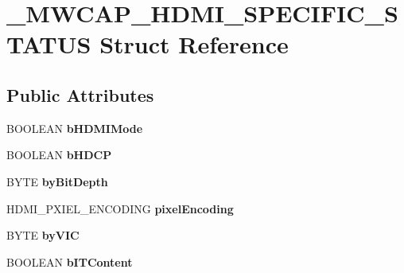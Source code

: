 \hypertarget{struct__MWCAP__HDMI__SPECIFIC__STATUS}{\section{\-\_\-\-M\-W\-C\-A\-P\-\_\-\-H\-D\-M\-I\-\_\-\-S\-P\-E\-C\-I\-F\-I\-C\-\_\-\-S\-T\-A\-T\-U\-S Struct Reference}
\label{struct__MWCAP__HDMI__SPECIFIC__STATUS}
}
\subsection*{Public Attributes}
\begin{DoxyCompactItemize}
\item 
\hypertarget{struct__MWCAP__HDMI__SPECIFIC__STATUS_adf5287f0b49c9d7e93fb0381a546e63e}{B\-O\-O\-L\-E\-A\-N {\bfseries b\-H\-D\-M\-I\-Mode}}\label{struct__MWCAP__HDMI__SPECIFIC__STATUS_adf5287f0b49c9d7e93fb0381a546e63e}

\item 
\hypertarget{struct__MWCAP__HDMI__SPECIFIC__STATUS_a53c56efa28ae084140ecbdb2af3921ca}{B\-O\-O\-L\-E\-A\-N {\bfseries b\-H\-D\-C\-P}}\label{struct__MWCAP__HDMI__SPECIFIC__STATUS_a53c56efa28ae084140ecbdb2af3921ca}

\item 
\hypertarget{struct__MWCAP__HDMI__SPECIFIC__STATUS_a5c46bc4a7139b1fbf68c6976c91d27d6}{B\-Y\-T\-E {\bfseries by\-Bit\-Depth}}\label{struct__MWCAP__HDMI__SPECIFIC__STATUS_a5c46bc4a7139b1fbf68c6976c91d27d6}

\item 
\hypertarget{struct__MWCAP__HDMI__SPECIFIC__STATUS_a4dba74af29d7c382d15c058b367f29e7}{H\-D\-M\-I\-\_\-\-P\-X\-I\-E\-L\-\_\-\-E\-N\-C\-O\-D\-I\-N\-G {\bfseries pixel\-Encoding}}\label{struct__MWCAP__HDMI__SPECIFIC__STATUS_a4dba74af29d7c382d15c058b367f29e7}

\item 
\hypertarget{struct__MWCAP__HDMI__SPECIFIC__STATUS_a8996706ebd6e7bc9e0ae7c536922f778}{B\-Y\-T\-E {\bfseries by\-V\-I\-C}}\label{struct__MWCAP__HDMI__SPECIFIC__STATUS_a8996706ebd6e7bc9e0ae7c536922f778}

\item 
\hypertarget{struct__MWCAP__HDMI__SPECIFIC__STATUS_aa7c92d9237b4e1aad72c28254bcd43c6}{B\-O\-O\-L\-E\-A\-N {\bfseries b\-I\-T\-Content}}\label{struct__MWCAP__HDMI__SPECIFIC__STATUS_aa7c92d9237b4e1aad72c28254bcd43c6}


\end{DoxyCompactItemize}
